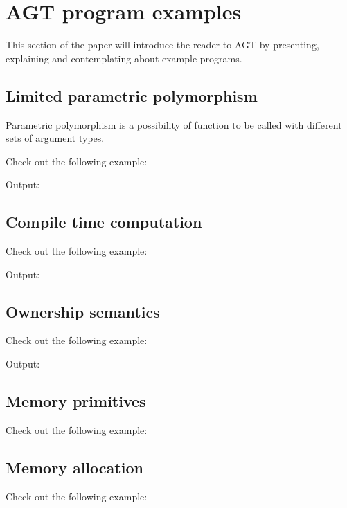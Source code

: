 \documentclass[times, utf8, diplomski]{fer}
\theoremstyle{definition}
\newcommand{\textcode}[3]{
    
}
\begin{document}
\chapter{AGT program examples}

This section of the paper will introduce the reader to AGT by presenting, explaining and contemplating
about example programs.

\section{Limited parametric polymorphism}

Parametric polymorphism is a possibility of function to be called with different sets of argument types.

Check out the following example:
\textcode{\resdir/programs/fib_runtime_recursion.agt}{}{a}

Output:
\textcode{\resdir/programs/fib_runtime_recursion.out}{}{a}


\section{Compile time computation}

Check out the following example:
\textcode{\resdir/programs/fib_compile_time.agt}{}{a}

Output:
\textcode{\resdir/programs/fib_compile_time.out}{}{a}


\section{Ownership semantics}

Check out the following example:
\textcode{\resdir/programs/shared_pointer.agt}{}{a}

Output:
\textcode{\resdir/programs/shared_pointer.out}{}{a}

\section{Memory primitives}

Check out the following example:
\textcode{\resdir/programs/memory_object.agt}{}{a}

\section{Memory allocation}

Check out the following example:
\textcode{\resdir/programs/memory_alloc.agt}{}{a}
\end{document}
